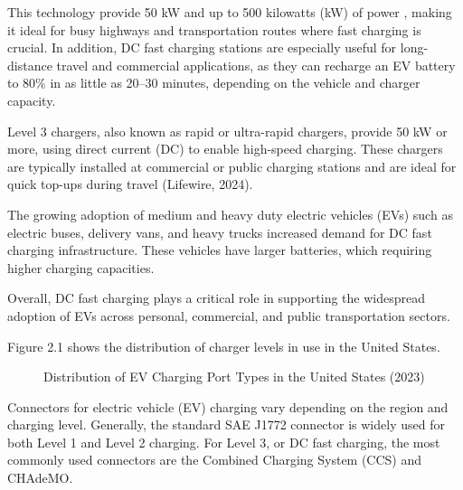 \begin{itemize}
    
    This technology provide 50 kW and up to 500 kilowatts (kW) of power \cite{Lifewire}, making it ideal for busy highways and transportation routes where fast charging is crucial\cite{Alternative Fuels Data Center}.
    In addition, DC fast charging stations are especially useful for long-distance travel and commercial applications, as they can recharge an EV battery to 80\% in as little as 20–30 minutes, depending on the vehicle and charger capacity\cite{Alternative Fuels Data Center}.

    Level 3 chargers, also known as rapid or ultra-rapid chargers, provide 50 kW or more, using direct current (DC) to enable high-speed charging. These chargers are typically installed at commercial or public charging stations and are ideal for quick top-ups during travel (Lifewire, 2024).

    The growing adoption of medium and heavy duty electric vehicles (EVs) such as electric buses, delivery vans, and heavy trucks increased demand for DC fast charging infrastructure. These vehicles have larger batteries, which requiring higher charging capacities. 
    
    Overall, DC fast charging plays a critical role in supporting the widespread adoption of EVs across personal, commercial, and public transportation sectors.
\end{itemize}

Figure 2.1 shows the distribution of charger levels in use in the United States\cite{Alternative Fuels Data Center}.

\begin{figure}[h!]
\centering
{}
\caption{Distribution of EV Charging Port Types in the United States (2023)}
\end{figure}

Connectors for electric vehicle (EV) charging vary depending on the region and charging level. Generally, the standard SAE J1772 connector is widely used for both Level 1 and Level 2 charging. For Level 3, or DC fast charging, the most commonly used connectors are the Combined Charging System (CCS) and CHAdeMO\cite{Alternative Fuels Data Center}.


